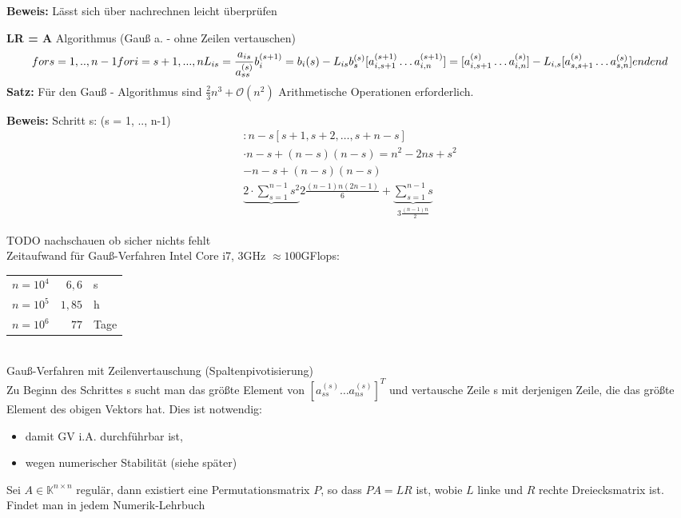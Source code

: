 \textbf{Beweis:}
Lässt sich über nachrechnen leicht überprüfen

\textbf{LR = A} %
Algorithmus (Gauß a. - ohne Zeilen vertauschen)
\begin{equation*}
  for s = 1, .., n-1  \\
	  for i = s+1, ..., n  \\
		  L_{is} = \frac{a_{is}}{a_{ss}^{\left(s\right)}}  \\
			b_i^{\left(s+1\right)} = b_i{\left(s\right)} - L_{is}b_s^{\left(s\right)}
			[a_{i, s+1}^{(s+1)} \ldots a_{i,n}^{(s+1)}] = [a_{i, s+1}^{(s)} \ldots a_{i,n}^{(s)}] - L_{i,s}[a_{s,s+1}^{(s)} \ldots a_{s,n}^{(s)}]
		end
	end
\end{equation*}
%
\textbf{Satz:}
Für den Gauß - Algorithmus sind $\frac{2}{3}n^3 + \mathcal O(n^2)$ Arithmetische Operationen erforderlich.

\textbf{Beweis:}
Schritt s: (s = 1, .., n-1)
\begin{equation*}
  \begin{aligned}
	  : n-s [s+1, s+2, \ldots, s+n - s] \\
		\cdot n-s + (n-s)(n-s) = n^2 - 2ns +s^2 \\
		- n-s + (n-s)(n-s) \\
		\hline
		\underbrace{2 \cdot \sum\limits_{s=1}^{n-1}{s^2}}{2 \frac{(n-1)n(2n-1)}{6}}+\underbrace{\sum\limits_{s=1}^{n-1}{s}}_{3\frac{(n-1)n}{2}}
	\end{aligned}
\end{equation*}

TODO nachschauen ob sicher nichts fehlt\\

Zeitaufwand für Gauß-Verfahren Intel Core i7, 3GHz $\approx 100$GFlops:\\
\begin{tabular}{c | r l}
  $n = 10^4$ & $6,6$ &s\\
  $n = 10^5$ & $1,85$ &h\\
  $n = 10^6$ & $77$ &Tage
\end{tabular}\\
Gauß-Verfahren mit Zeilenvertauschung (Spaltenpivotisierung)\\
Zu Beginn des Schrittes s sucht man das größte Element von $[a_{ss}^{(s)}\ldots a_{ns}^{(s)}]^T$
und vertausche Zeile s mit derjenigen Zeile, die das größte Element des obigen Vektors hat.
Dies ist notwendig:
\begin{itemize}
  \item damit GV i.A. durchführbar ist,
  \item wegen numerischer Stabilität (siehe später)
\end{itemize}
\satz Sei $A \in \mathbb{K}^{n \times n}$ regulär, dann existiert eine Permutationsmatrix $P$,
so dass $PA = LR$ ist, wobie $L$ linke und $R$ rechte Dreiecksmatrix ist.\\
\beweis Findet man in jedem Numerik-Lehrbuch\\
\\

